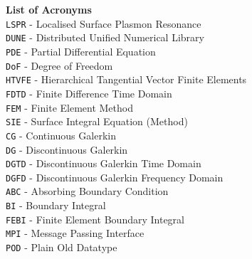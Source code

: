 \documentclass[a4paper,11pt]{article}
\begin{document}
\begin{titlepage}
\noindent
\textbf{List of Acronyms} \\
\texttt{LSPR} - Localised Surface Plasmon Resonance\\
%
%
\texttt{DUNE} - Distributed Unified Numerical Library\\
\texttt{PDE} - Partial Differential Equation\\
\texttt{DoF} - Degree of Freedom\\
\texttt{HTVFE} - Hierarchical Tangential Vector Finite Elements\\
\texttt{FDTD} - Finite Difference Time Domain \\
\texttt{FEM} - Finite Element Method\\
\texttt{SIE} - Surface Integral Equation (Method)\\
\texttt{CG} - Continuous Galerkin\\
\texttt{DG} - Discontinuous Galerkin\\
\texttt{DGTD} - Discontinuous Galerkin Time Domain\\
\texttt{DGFD} - Discontinuous Galerkin Frequency Domain\\
\texttt{ABC} - Absorbing Boundary Condition\\
\texttt{BI} - Boundary Integral \\
\texttt{FEBI} - Finite Element Boundary Integral\\
%
%
\texttt{MPI} - Message Passing Interface\\
\texttt{POD} - Plain Old Datatype\\

\end{titlepage}
\end{document}
